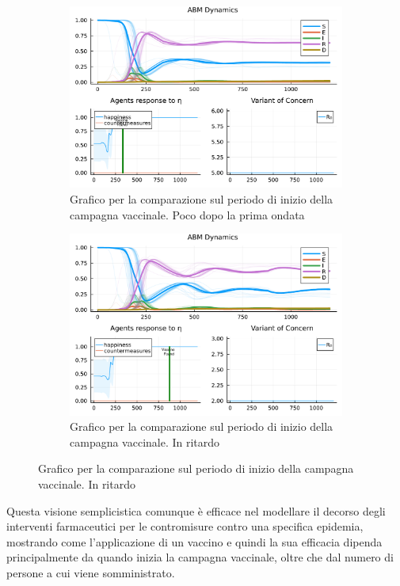 \begin{figure}[!hb]
\begin{subfigure}[b]{0.45\textwidth}
		\includegraphics[width=\textwidth]{img/SocialNetworkABM_5_V.pdf}
		\caption{Grafico per la comparazione sul periodo di inizio della campagna vaccinale. Poco dopo la prima ondata}
		\label{fig:comparison_vax_3}
	\end{subfigure}
	\hfill
	\begin{subfigure}[b]{0.45\textwidth}
		\centering
		\includegraphics[width=\textwidth]{img/SocialNetworkABM_2_V.pdf}
		\caption{Grafico per la comparazione sul periodo di inizio della campagna vaccinale. In ritardo}
		\label{fig:comparison_vax_4}
	\end{subfigure}
\end{figure}

Questa visione semplicistica comunque è efficace nel modellare il decorso degli 
interventi farmaceutici per le contromisure contro una specifica epidemia, 
mostrando come l'applicazione di un vaccino e quindi la sua efficacia dipenda 
principalmente da quando inizia la campagna vaccinale, oltre che 
dal numero di persone a cui viene somministrato.